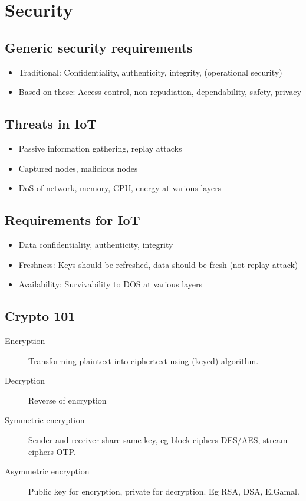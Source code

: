 \section{Security}

\subsection{Generic security requirements}

\begin{itemize}
		\item Traditional: Confidentiality, authenticity, integrity, (operational security)
		\item Based on these: Access control, non-repudiation, dependability, safety, privacy
\end{itemize}

\subsection{Threats in IoT}

\begin{itemize}
		\item Passive information gathering, replay attacks
		\item Captured nodes, malicious nodes
		\item DoS of network, memory, CPU, energy at various layers
\end{itemize}

\subsection{Requirements for IoT}

\begin{itemize}
		\item Data confidentiality, authenticity, integrity
		\item Freshness: Keys should be refreshed, data should be fresh (not replay attack)
		\item Availability: Survivability to DOS at various layers
\end{itemize}

\subsection{Crypto 101}

\begin{description}
		\item[Encryption] Transforming plaintext into ciphertext using (keyed)
				algorithm.
		\item[Decryption] Reverse of encryption
		\item[Symmetric encryption] Sender and receiver share same key, eg
				block ciphers DES/AES, stream ciphers OTP.
		\item[Asymmetric encryption] Public key for encryption, private for
				decryption. Eg RSA, DSA, ElGamal.
\end{description}

